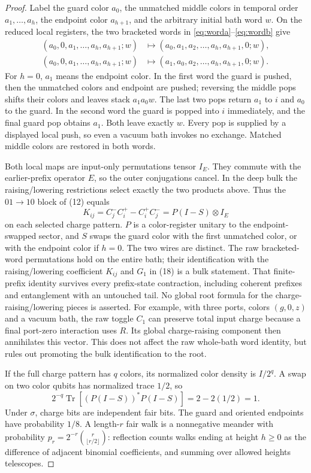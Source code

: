 \documentclass[11pt]{article}
\newcommand{\Tr}{\operatorname{Tr}}
\begin{document}
\begin{proof}
Label the guard color $a_0$, the unmatched middle colors in temporal
order $a_1,\ldots,a_h$, the endpoint color $a_{h+1}$, and the
arbitrary initial bath word $w$. On the reduced local registers, the
two bracketed words in \eqref{eq:worda}--\eqref{eq:wordb} give
\begin{align*}
 (a_0,0,a_1,\ldots,a_h,a_{h+1};w)
   &\longmapsto(a_0,a_1,a_2,\ldots,a_h,a_{h+1},0;w),\\
 (a_0,0,a_1,\ldots,a_h,a_{h+1};w)
   &\longmapsto(a_1,a_0,a_2,\ldots,a_h,a_{h+1},0;w).
\end{align*}
For $h=0$, $a_1$ means the endpoint color. In the first word the guard
is pushed, then the unmatched colors and endpoint are pushed; reversing
the middle pops shifts their colors and leaves stack $a_1a_0w$.
The last two pops return $a_1$ to $i$ and $a_0$ to the guard. In the
second word the guard is popped into $i$ immediately, and the final
guard pop obtains $a_1$. Both leave exactly $w$. Every pop is supplied
by a displayed local push, so even a vacuum bath invokes no exchange.
Matched middle colors are restored in both words.

Both local maps are input-only permutations tensor $I_E$. They commute
with the earlier-prefix operator $E$, so the outer conjugations cancel.
In the deep bulk the raising/lowering restrictions select exactly the
two products above. Thus the $01\to10$ block of (12) equals
\[
 K_{ij}=C_j^-C_i^+-C_i^+C_j^-
       =P(I-S)\otimes I_E
 \tag{18}
\]
on each selected charge pattern. $P$ is a color-register unitary to
the endpoint-swapped sector, and $S$ swaps the guard color with the
first unmatched color, or with the endpoint color if $h=0$. The two
wires are distinct. The raw bracketed-word permutations hold on the
entire bath; their identification with the raising/lowering coefficient
$K_{ij}$ and $G_1$ in (18) is a bulk statement. That finite-prefix
identity survives every prefix-state contraction, including coherent
prefixes and entanglement with an untouched tail. No global root formula
for the charge-raising/lowering pieces is asserted.
For example, with three ports, colors $(g,0,z)$ and a vacuum bath,
the raw toggle $C_1$ can preserve total input charge because a final
port-zero interaction uses $R$. Its global charge-raising component
then annihilates this vector. This does not affect the raw whole-bath
word identity, but rules out promoting the bulk identification to the root.

If the full charge pattern has $q$ colors, its normalized color density
is $I/2^q$. A swap on two color qubits has normalized trace $1/2$, so
\[
 2^{-q}\Tr[(P(I-S))^*P(I-S)]=2-2(1/2)=1.
 \tag{19}
\]
Under $\sigma$, charge bits are independent fair bits. The guard and
oriented endpoints have probability $1/8$. A length-$r$ fair walk is
a nonnegative meander with probability
$p_r=2^{-r}\binom r{\lfloor r/2\rfloor}$: reflection counts walks
ending at height $h\ge0$ as the difference of adjacent binomial
coefficients, and summing over allowed heights telescopes.


\end{proof}
\end{document}
